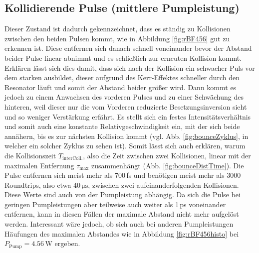 \documentclass[bachelor,       %
               twoside,        %
               BCOR10mm,       %
               liststotoc,nomtotoc,bibtotoc, %
               english,ngerman, %
               final,          %
               ]{GAUBM}
\begin{document}
\subsection{Kollidierende Pulse (mittlere Pumpleistung)}
\label{sec:bounce}
Dieser Zustand ist dadurch gekennzeichnet, dass es ständig zu Kollisionen zwischen den beiden Pulsen kommt, wie in Abbildung \ref{fig:rBF456} gut zu erkennen ist.
Diese entfernen sich danach schnell voneinander bevor der Abstand beider Pulse linear abnimmt und es schließlich zur erneuten Kollision kommt.
Erklären lässt sich dies damit, dass sich nach der Kollision ein schwacher Puls vor dem starken ausbildet, dieser aufgrund des Kerr-Effektes schneller durch den Resonator läuft und somit der Abstand beider größer wird.
Dann kommt es jedoch zu einem Anwachsen des vorderen Pulses und zu einer Schwächung des hinteren, weil dieser nur die vom Vorderen reduzierte Besetzungsinversion sieht und so weniger Verstärkung erfährt.
Es stellt sich ein festes Intensitätsverhältnis und somit auch eine konstante Relativgeschwindigkeit ein, mit der sich beide annähern, bis es zur nächsten Kollision kommt (vgl. Abb. \ref{fig:bounceZyklus}, in welcher ein solcher Zyklus zu sehen ist).
Somit lässt sich auch erklären, warum die Kollisionszeit $T_\text{interColl.}$, also die Zeit zwischen zwei Kollisionen, linear mit der maximalen Entfernung $\tau_\text{max}$ zusammenhängt (Abb. \ref{fig:bounceDistTime}).
Die Pulse entfernen sich meist mehr als 700\,fs und benötigen meist mehr als 3000 Roundtrips, also etwa $40\,\si{\micro\second}$, zwischen zwei aufeinanderfolgenden Kollisionen.
Diese Werte sind auch von der Pumpleistung abhängig.
Da sich die Pulse bei geringen Pumpleistungen aber teilweise auch weiter als 1\,ps voneinander entfernen, kann in diesen Fällen der maximale Abstand nicht mehr aufgelöst werden.
Interessant wäre jedoch, ob sich auch bei anderen Pumpleistungen Häufungen des maximalen Abstandes wie in Abbildung \ref{fig:rBF456histo} bei $P_\text{Pump}=4.56\,$W ergeben.
\end{document}
